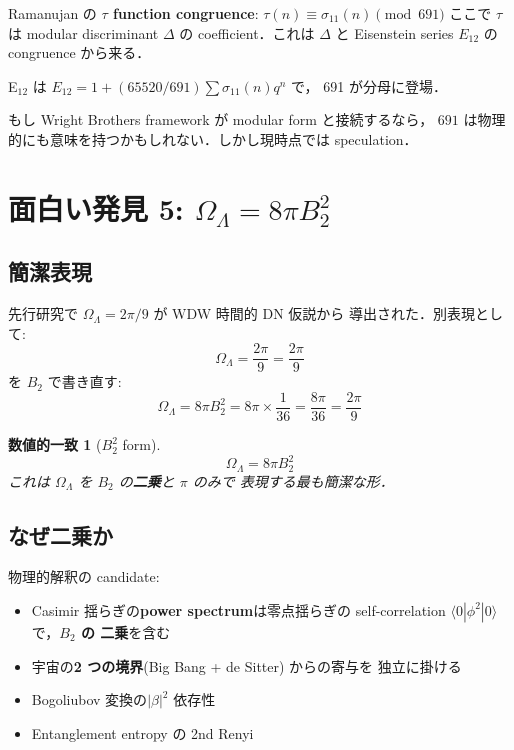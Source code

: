 \documentclass[11pt,a4paper]{article}
\newtheorem{coincidence}{数値的一致}
\begin{document}
Ramanujan の \textbf{$\tau$ function congruence}:
$\tau(n) \equiv \sigma_{11}(n) \pmod{691}$ ここで $\tau$ は
modular discriminant $\Delta$ の coefficient．これは $\Delta$ と
Eisenstein series $E_{12}$ の congruence から来る．

E$_{12}$ は $E_{12} = 1 + (65520/691)\sum \sigma_{11}(n) q^n$ で，
691 が分母に登場．

もし Wright Brothers framework が modular form と接続するなら，
$691$ は物理的にも意味を持つかもしれない．しかし現時点では speculation．

\section{面白い発見 5: $\Omega_\Lambda = 8\pi B_2^2$}

\subsection{簡潔表現}

先行研究で $\Omega_\Lambda = 2\pi/9$ が WDW 時間的 DN 仮説から
導出された．別表現として:
\begin{equation}
\Omega_\Lambda = \frac{2\pi}{9} = \frac{2\pi}{9}
\end{equation}
を $B_2$ で書き直す:
\begin{equation}
\Omega_\Lambda = 8\pi B_2^2 = 8\pi \times \frac{1}{36} = \frac{8\pi}{36} = \frac{2\pi}{9}
\end{equation}

\begin{coincidence}[$B_2^2$ form]
\begin{equation}
\boxed{\Omega_\Lambda = 8\pi B_2^2}
\end{equation}
これは $\Omega_\Lambda$ を $B_2$ の\textbf{二乗}と $\pi$ のみで
表現する最も簡潔な形．
\end{coincidence}

\subsection{なぜ二乗か}

物理的解釈の candidate:
\begin{itemize}
\item Casimir 揺らぎの\textbf{power spectrum}は零点揺らぎの
self-correlation $\langle 0|\phi^2|0\rangle$ で，\textbf{$B_2$ の
二乗}を含む
\item 宇宙の\textbf{2 つの境界}(Big Bang + de Sitter) からの寄与を
独立に掛ける
\item Bogoliubov 変換の$|\beta|^2$ 依存性
\item Entanglement entropy の 2nd Renyi
\end{itemize}
\end{document}
